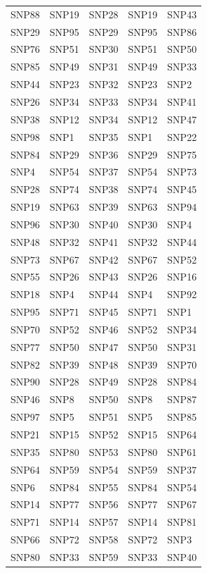 \begin{table}[ht]
\begin{tabular}{lllll}
  SNP88 & SNP19 & SNP28 & SNP19 & SNP43 \\ 
  SNP29 & SNP95 & SNP29 & SNP95 & SNP86 \\ 
  SNP76 & SNP51 & SNP30 & SNP51 & SNP50 \\ 
  SNP85 & SNP49 & SNP31 & SNP49 & SNP33 \\ 
  SNP44 & SNP23 & SNP32 & SNP23 & SNP2 \\ 
  SNP26 & SNP34 & SNP33 & SNP34 & SNP41 \\ 
  SNP38 & SNP12 & SNP34 & SNP12 & SNP47 \\ 
  SNP98 & SNP1 & SNP35 & SNP1 & SNP22 \\ 
  SNP84 & SNP29 & SNP36 & SNP29 & SNP75 \\ 
  SNP4 & SNP54 & SNP37 & SNP54 & SNP73 \\ 
  SNP28 & SNP74 & SNP38 & SNP74 & SNP45 \\ 
  SNP19 & SNP63 & SNP39 & SNP63 & SNP94 \\ 
  SNP96 & SNP30 & SNP40 & SNP30 & SNP4 \\ 
  SNP48 & SNP32 & SNP41 & SNP32 & SNP44 \\ 
  SNP73 & SNP67 & SNP42 & SNP67 & SNP52 \\ 
  SNP55 & SNP26 & SNP43 & SNP26 & SNP16 \\ 
  SNP18 & SNP4 & SNP44 & SNP4 & SNP92 \\ 
  SNP95 & SNP71 & SNP45 & SNP71 & SNP1 \\ 
  SNP70 & SNP52 & SNP46 & SNP52 & SNP34 \\ 
  SNP77 & SNP50 & SNP47 & SNP50 & SNP31 \\ 
  SNP82 & SNP39 & SNP48 & SNP39 & SNP70 \\ 
  SNP90 & SNP28 & SNP49 & SNP28 & SNP84 \\ 
  SNP46 & SNP8 & SNP50 & SNP8 & SNP87 \\ 
  SNP97 & SNP5 & SNP51 & SNP5 & SNP85 \\ 
  SNP21 & SNP15 & SNP52 & SNP15 & SNP64 \\ 
  SNP35 & SNP80 & SNP53 & SNP80 & SNP61 \\ 
  SNP64 & SNP59 & SNP54 & SNP59 & SNP37 \\ 
  SNP6 & SNP84 & SNP55 & SNP84 & SNP54 \\ 
  SNP14 & SNP77 & SNP56 & SNP77 & SNP67 \\ 
  SNP71 & SNP14 & SNP57 & SNP14 & SNP81 \\ 
  SNP66 & SNP72 & SNP58 & SNP72 & SNP3 \\ 
  SNP80 & SNP33 & SNP59 & SNP33 & SNP40 \\ 

\end{tabular}
\end{table}
